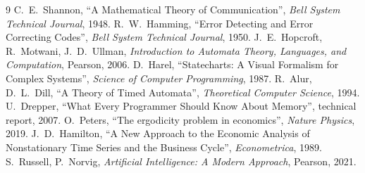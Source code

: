 \documentclass[11pt,a4paper]{article}
\begin{document}
\begin{thebibliography}{9}
 C.~E.~Shannon, ``A Mathematical Theory of Communication'',
\emph{Bell System Technical Journal}, 1948.
 R.~W.~Hamming, ``Error Detecting and Error Correcting Codes'',
\emph{Bell System Technical Journal}, 1950.
 J.~E.~Hopcroft, R.~Motwani, J.~D.~Ullman, \emph{Introduction
to Automata Theory, Languages, and Computation}, Pearson, 2006.
 D.~Harel, ``Statecharts: A Visual Formalism for Complex
Systems'', \emph{Science of Computer Programming}, 1987.
 R.~Alur, D.~L.~Dill, ``A Theory of Timed Automata'',
\emph{Theoretical Computer Science}, 1994.
 U.~Drepper, ``What Every Programmer Should Know About
Memory'', technical report, 2007.
 O.~Peters, ``The ergodicity problem in economics'',
\emph{Nature Physics}, 2019.
 J.~D.~Hamilton, ``A New Approach to the Economic Analysis of
Nonstationary Time Series and the Business Cycle'', \emph{Econometrica}, 1989.
 S.~Russell, P.~Norvig, \emph{Artificial Intelligence: A Modern
Approach}, Pearson, 2021.
\end{thebibliography}
\end{document}
